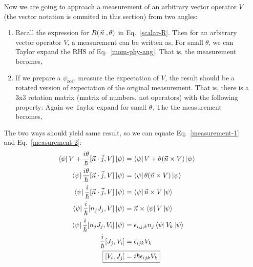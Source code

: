 \documentclass{school-22.101-notes}
\begin{document}
Now we are going to approach a measurement of an arbitrary vector operator $V$(the vector notation is ommited in this section) from two angles:
\begin{enumerate}
\item Recall the expression for $R(\left.\vec{n}\right., \theta)$ in Eq.~\ref{scalar-R}. Then for an arbitrary vector operator $V$, a measurement can be written as, 
For small $\theta$, we can Taylor expand the RHS of Eq.~\ref{mom-phy-ang}, 
That is, the measurement becomes, 

\item If we prepare a $\psi_{\mathrm{rot}}$, measure the expectation of $V$, the result should be a rotated version of expectation of the original measurement. That is, there is a 3x3 rotation matrix (matrix of numbers, not operators) with the following property: 
Again we Taylor expand for small $\theta$, 
The the measurement becomes, 
\end{enumerate}
The two ways should yield same result, so we can equate Eq.~\ref{measurement-1} and Eq.~\ref{measurement-2}: 
\begin{align}
\bra{\psi} V + \frac{i \theta}{\hbar} [\vec{n} \cdot \vec{j}, V] \ket{\psi}  &=  \bra{\psi} V + \theta (\vec{n} \cross V ) \ket{\psi} \\
\bra{\psi}  \frac{i \theta}{\hbar} [\vec{n} \cdot \vec{j}, V] \ket{\psi}  &=  \bra{\psi} \theta (\vec{n} \cross V ) \ket{\psi} \\
\bra{\psi}  \frac{i}{\hbar} [\vec{n} \cdot \vec{j}, V] \ket{\psi}  &=  \bra{\psi} \vec{n} \cross V \ket{\psi} \\
\bra{\psi} \frac{i}{\hbar} [n_j J_j, V] \ket{\psi}  &= \vec{n} \cross \bra{\psi} V \ket{\psi} \\
\bra{\psi} \frac{i}{\hbar} [n_j J_j, V_i] \ket{\psi} &= \epsilon_{i,j,k} n_j \bra{\psi} V_k \ket{\psi} \\
\frac{i}{\hbar} [J_j, V_i] &= \epsilon_{ijk} V_k \\
\Aboxed{ [V_i, J_j] &= i \hbar \epsilon_{ijk} V_k }  \label{J-basic}
\end{align}
\end{document}
